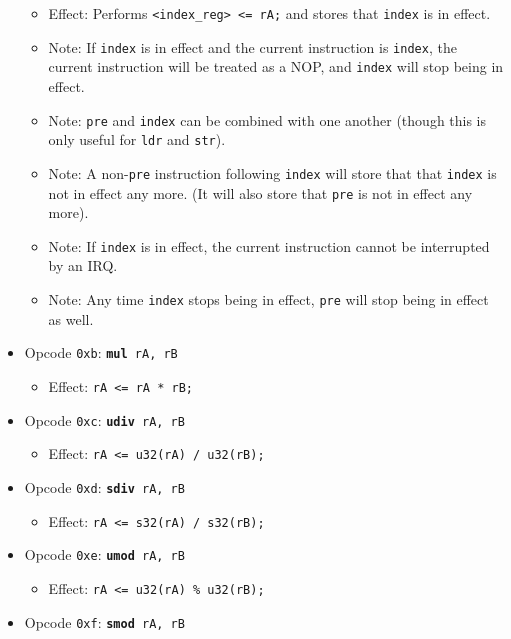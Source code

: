 \documentclass{article}
\begin{document}
\begin{itemize}
\begin{itemize}
		\item Effect: Performs \texttt{<index\_reg> <= rA;} and stores
		that \texttt{index} is in effect.
		\item Note: If \texttt{index} is in effect and the current
		instruction is \texttt{index}, the current instruction will be
		treated as a NOP, and \texttt{index} will stop being in effect.
		\item Note: \texttt{pre} and \texttt{index} can be combined
		with one another (though this is only useful for \texttt{ldr}
		and \texttt{str}).
		\item Note: A non-\texttt{pre} instruction following
		\texttt{index} will store that that \texttt{index} is not in
		effect any more. (It will also store that \texttt{pre} is not
		in effect any more).
		\item Note: If \texttt{index} is in effect, the current
		instruction cannot be interrupted by an IRQ.
		\item Note: Any time \texttt{index} stops being in effect,
		\texttt{pre} will stop being in effect as well.
		\end{itemize}
	\item Opcode \texttt{0xb}:
		\texttt{\textbf{mul} rA, rB}
		\begin{itemize}
		\item Effect: \texttt{rA <= rA * rB;}
		\end{itemize}
	\item Opcode \texttt{0xc}:
		\texttt{\textbf{udiv} rA, rB}
		\begin{itemize}
		\item Effect: \texttt{rA <= u32(rA) / u32(rB);}
		\end{itemize}
	\item Opcode \texttt{0xd}:
		\texttt{\textbf{sdiv} rA, rB}
		\begin{itemize}
		\item Effect: \texttt{rA <= s32(rA) / s32(rB);}
		\end{itemize}
	\item Opcode \texttt{0xe}:
		\texttt{\textbf{umod} rA, rB}
		\begin{itemize}
		\item Effect: \texttt{rA <= u32(rA) \% u32(rB);}
		\end{itemize}
	\item Opcode \texttt{0xf}:
		\texttt{\textbf{smod} rA, rB}
		\begin{itemize}

\end{itemize}
\end{itemize}
\end{document}
